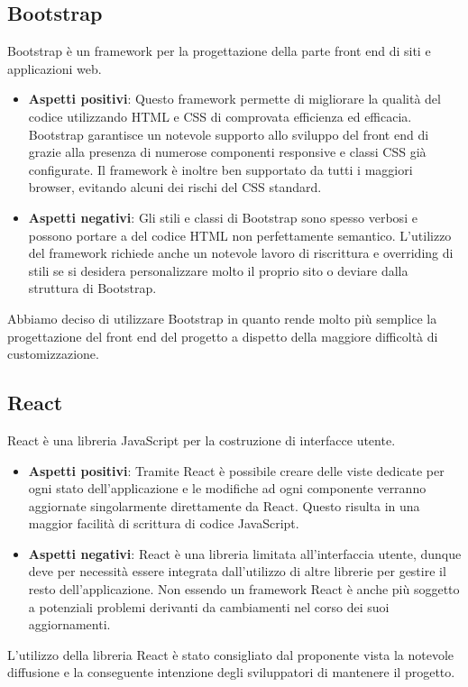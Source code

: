 \subsection{Bootstrap}
Bootstrap è un framework per la progettazione della parte front end di siti e applicazioni web. 
\begin{itemize}
	\item \textbf{Aspetti positivi}: Questo framework permette di migliorare la qualità del codice utilizzando  HTML e CSS di comprovata efficienza ed efficacia. Bootstrap garantisce un notevole supporto allo sviluppo del front end di \ProjectName{} grazie alla presenza di numerose componenti responsive e classi CSS già configurate. Il framework è inoltre ben supportato da tutti i maggiori browser, evitando alcuni dei rischi del CSS standard.
	\item \textbf{Aspetti negativi}: Gli stili e classi di Bootstrap sono spesso verbosi e possono portare a del codice HTML non perfettamente semantico. L'utilizzo del framework richiede anche un notevole lavoro di riscrittura e overriding di stili se si desidera personalizzare molto il proprio sito o deviare dalla struttura di Bootstrap.
\end{itemize}
Abbiamo deciso di utilizzare Bootstrap in quanto rende molto più semplice la progettazione del front end del progetto a dispetto della maggiore difficoltà di customizzazione.

\subsection{React}
React è una libreria JavaScript per la costruzione di interfacce utente.
\begin{itemize}
	\item \textbf{Aspetti positivi}: Tramite React è possibile creare delle viste dedicate per ogni stato dell'applicazione e le modifiche ad ogni componente verranno aggiornate singolarmente direttamente da React. Questo risulta in una maggior facilità di scrittura di codice JavaScript. \item \textbf{Aspetti negativi}: React è una libreria limitata all'interfaccia utente, dunque deve per necessità essere integrata dall'utilizzo di altre librerie per gestire il resto dell'applicazione. Non essendo un framework React è anche più soggetto a potenziali problemi derivanti da cambiamenti nel corso dei suoi aggiornamenti. 
\end{itemize} 
L'utilizzo della libreria React è stato consigliato dal proponente vista la notevole diffusione e la conseguente intenzione degli sviluppatori di mantenere il progetto.

